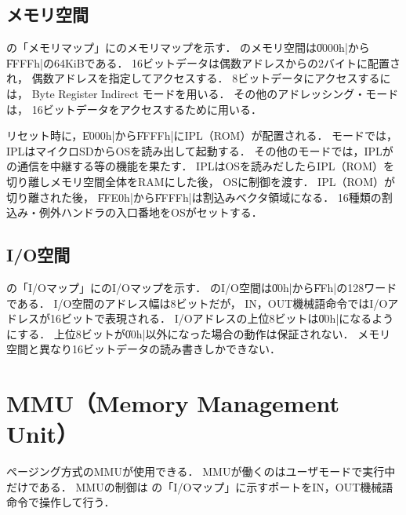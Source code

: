 \subsection{メモリ空間}
の「メモリマップ」に{\tac}のメモリマップを示す．
{\tac}のメモリ空間は\|0000h|から\|FFFFh|の64KiBである．
16ビットデータは偶数アドレスからの2バイトに配置され，
偶数アドレスを指定してアクセスする．
8ビットデータにアクセスするには，
Byte Register Indirect モードを用いる．
その他のアドレッシング・モードは，
16ビットデータをアクセスするために用いる．

リセット時に，\|E000h|から\|FFFFh|にIPL（ROM）が配置される．
{\tac}モードでは，IPLはマイクロSDからOSを読み出して起動する．
その他のモードでは，IPLが{\tec}の通信を中継する等の機能を果たす．
IPLはOSを読みだしたらIPL（ROM）を切り離しメモリ空間全体をRAMにした後，
OSに制御を渡す．
IPL（ROM）が切り離された後，
\|FFE0h|から\|FFFFh|は割込みベクタ領域になる．
16種類の割込み・例外ハンドラの入口番地をOSがセットする．

\subsection{I/O空間}
の「I/Oマップ」に{\tac}のI/Oマップを示す．
{\tac}のI/O空間は\|00h|から\|FFh|の128ワードである．
I/O空間のアドレス幅は8ビットだが，
IN，OUT機械語命令ではI/Oアドレスが16ビットで表現される．
I/Oアドレスの上位8ビットは\|00h|になるようにする．
上位8ビットが\|00h|以外になった場合の動作は保証されない．
メモリ空間と異なり16ビットデータの読み書きしかできない．

\section{MMU（Memory Management Unit）}
ページング方式のMMUが使用できる．
MMUが働くのはユーザモードで実行中だけである．
MMUの制御は
の「I/Oマップ」に示すポートをIN，OUT機械語命令で操作して行う．

